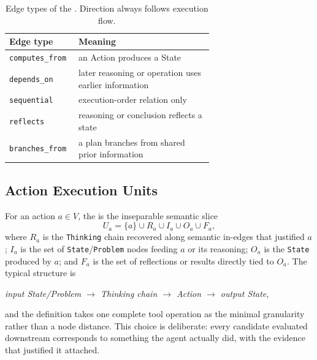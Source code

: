 \begin{table}[t]
\caption{Edge types of the \stg{}. Direction always follows execution flow.}
\label{tab:edgetypes}
\begin{tabular}{@{}lp{0.66\linewidth}@{}}
\toprule
Edge type & Meaning \\
\midrule
\texttt{computes\_from} & an Action produces a State \\
\texttt{depends\_on} & later reasoning or operation uses earlier information \\
\texttt{sequential} & execution-order relation only \\
\texttt{reflects} & reasoning or conclusion reflects a state \\
\texttt{branches\_from} & a plan branches from shared prior information \\
\bottomrule
\end{tabular}
\end{table}

\subsection{Action Execution Units}
For an action $a\in V$, the \aeu{} is the inseparable semantic slice
\begin{equation}
U_a=\{a\}\cup R_a\cup I_a\cup O_a\cup F_a,
\label{eq:unit}
\end{equation}
where $R_a$ is the \texttt{Thinking} chain recovered along semantic in-edges that justified $a$; $I_a$ is the set of \texttt{State}/\texttt{Problem} nodes feeding $a$ or its reasoning; $O_a$ is the \texttt{State} produced by $a$; and $F_a$ is the set of reflections or results directly tied to $O_a$. The typical structure is
\begin{center}
\emph{input State/Problem $\rightarrow$ Thinking chain $\rightarrow$ Action $\rightarrow$ output State,}
\end{center}
and the definition takes one complete tool operation as the minimal granularity rather than a node distance. This choice is deliberate: every candidate evaluated downstream corresponds to something the agent actually did, with the evidence that justified it attached.

